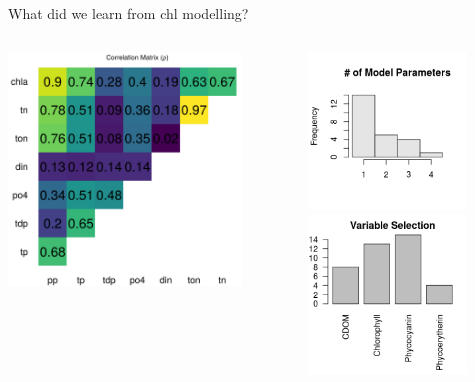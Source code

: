 \documentclass[compress,noflama,nosectionpages]{beamer}
\begin{document}
\begin{frame}{What did we learn from chl modelling?}
	\begin{columns}
		\begin{column}[c]{6cm}
			\vspace{-2em}
			\includegraphics[width=6.2cm,keepaspectratio=true]{figures/chlcor_heatmap.png}
		\end{column}
		\begin{column}[c]{6cm}
			\begin{center}
			\includegraphics[width=4.2cm,keepaspectratio=true,clip=TRUE,trim= 0mm 5mm 0mm 7mm]{figures/modelparam_counts.png}\\
			\includegraphics[width=4.2cm,keepaspectratio=true,clip=TRUE,trim= 0mm 0mm 0mm 2mm]{figures/modelparam_hist.png}
			\end{center}
		\end{column}
	\end{columns}
\end{frame}
\end{document}
